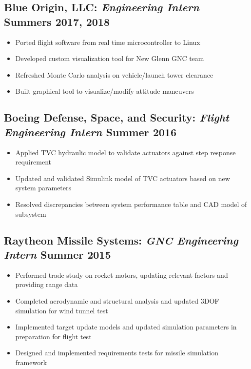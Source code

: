 \documentclass{article}
\begin{document}
\subsection{\textbf{Blue Origin, LLC:} \textit{Engineering Intern} \hfill Summers 2017, 2018}
\begin{itemize}
    \item Ported flight software from real time microcontroller to Linux
    \item Developed custom visualization tool for New Glenn GNC team
    \item Refreshed Monte Carlo analysis on vehicle/launch tower clearance
    \item Built graphical tool to visualize/modify attitude maneuvers
\end{itemize}

\subsection{\textbf{Boeing Defense, Space, and Security:} \textit{Flight Engineering Intern} \hfill Summer 2016}
\begin{itemize}
    \item Applied TVC hydraulic model to validate actuators against step response requirement
    \item Updated and validated Simulink model of TVC actuators based on new system parameters
    \item Resolved discrepancies between system performance table and CAD model of subsystem
\end{itemize}

\subsection{\textbf{Raytheon Missile Systems:} \textit{GNC Engineering Intern} \hfill Summer 2015}
\begin{itemize}
    \item Performed trade study on rocket motors, updating relevant factors and providing range data
    \item Completed aerodynamic and structural analysis and updated 3DOF simulation for wind tunnel test
    \item Implemented target update models and updated simulation parameters in preparation for flight test
    \item Designed and implemented requirements tests for missile simulation framework
\end{itemize}
\end{document}
